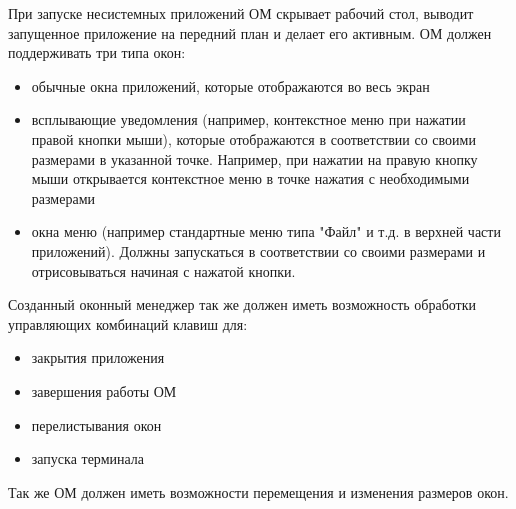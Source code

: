 При запуске несистемных приложений ОМ скрывает рабочий стол, выводит запущенное приложение на передний план и делает его активным. ОМ должен поддерживать три типа окон:
\begin{itemize}
\item обычные окна приложений, которые отображаются во весь экран
\item всплывающие уведомления (например, контекстное меню при нажатии правой кнопки мыши), которые отображаются в соответствии со своими размерами в указанной точке. Например, при нажатии на правую кнопку мыши открывается контекстное меню в точке нажатия с необходимыми размерами
\item окна меню (например стандартные меню типа "Файл" и т.д. в верхней части приложений). Должны запускаться в соответствии со своими размерами и отрисовываться начиная с нажатой кнопки.
\end{itemize}

Созданный оконный менеджер так же должен иметь возможность обработки управляющих комбинаций клавиш для:
\begin{itemize}
\item закрытия приложения
\item завершения работы ОМ
\item перелистывания окон
\item запуска терминала
\end{itemize}

Так же ОМ должен иметь возможности перемещения и изменения размеров окон.